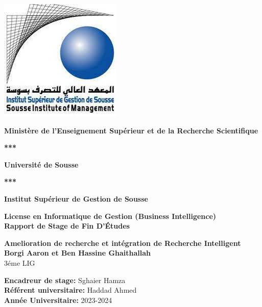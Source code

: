 \begin{titlepage}
    \begin{center}
        \includegraphics[width=.50\textwidth]{logos/isgs.png}
    
        \vspace*{0.5cm}
        \large
        \textbf{Ministère de l'Enseignement Supérieur et de la Recherche Scientifique}
        
        \vspace*{0.3cm}
        \textbf{***}

        \vspace*{0.3cm}
        \textbf{Université de Sousse}

        \vspace*{0.3cm}
        \textbf{***}

        \vspace{0.3cm}
        \textbf{Institut Supérieur de Gestion de Sousse}

        \vspace{0.3cm}
        \large
        \vspace*{0.3cm}
        \textbf{License en Informatique de Gestion (Business Intelligence)}\\

        \vspace*{0.3cm}
        \textbf{Rapport de Stage de Fin D'Études}

        \large
        \vspace*{0.3cm}
        \textbf{Amelioration de recherche et intégration de Recherche Intelligent}\\
            
        \vspace{1cm}
        \large
        \textbf{Borgi Aaron et Ben Hassine Ghaithallah}\\
        3éme LIG\\
        \vspace{0.5cm}
        
        \textbf{Encadreur de stage: } Sghaier Hamza \\        
        \textbf{Référent universitaire: } Haddad Ahmed \\
        \textbf{Année Universitaire: } 2023-2024
        
    \end{center}
\end{titlepage}
\restoregeometry
